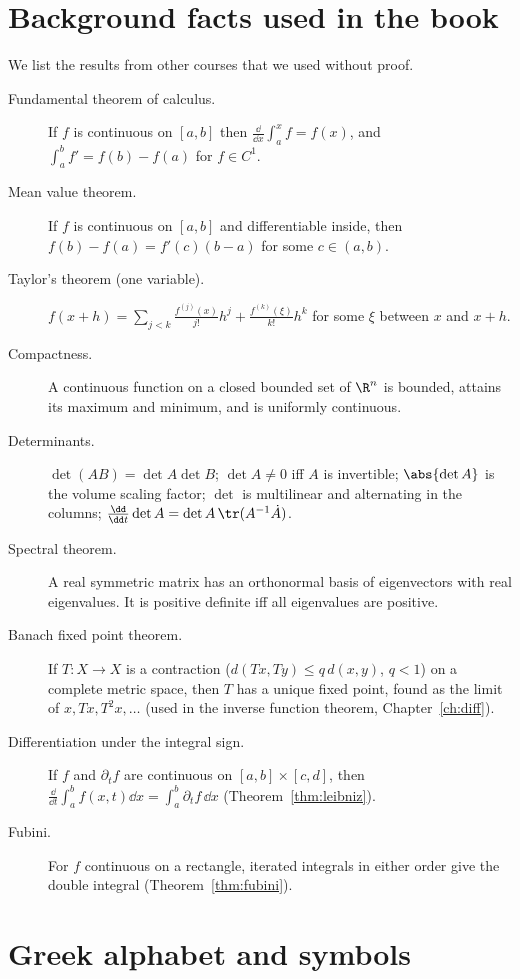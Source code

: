 \section{Background facts used in the book}

We list the results from other courses that we used without proof.

\begin{description}
  \item[Fundamental theorem of calculus.] If $f$ is continuous on $[a,b]$ then $\frac{\dd}{\dd x}\int_a^xf=f(x)$, and $\int_a^bf'=f(b)-f(a)$ for $f\in C^1$.
  \item[Mean value theorem.] If $f$ is continuous on $[a,b]$ and differentiable inside, then $f(b)-f(a)=f'(c)(b-a)$ for some $c\in(a,b)$.
  \item[Taylor's theorem (one variable).] $f(x+h)=\sum_{j<k}\frac{f^{(j)}(x)}{j!}h^j+\frac{f^{(k)}(\xi)}{k!}h^k$ for some $\xi$ between $x$ and $x+h$.
  \item[Compactness.] A continuous function on a closed bounded set of $\R^n$ is bounded, attains its maximum and minimum, and is uniformly continuous.
  \item[Determinants.] $\det(AB)=\det A\det B$; $\det A\neq0$ iff $A$ is invertible; $\abs{\det A}$ is the volume scaling factor; $\det$ is multilinear and alternating in the columns; $\frac{\dd}{\dd t}\det A=\det A\,\tr(A^{-1}\dot A)$.
  \item[Spectral theorem.] A real symmetric matrix has an orthonormal basis of eigenvectors with real eigenvalues. It is positive definite iff all eigenvalues are positive.
  \item[Banach fixed point theorem.] If $T:X\to X$ is a contraction ($d(Tx,Ty)\le q\,d(x,y)$, $q<1$) on a complete metric space, then $T$ has a unique fixed point, found as the limit of $x,Tx,T^2x,\dots$ (used in the inverse function theorem, Chapter~\ref{ch:diff}).
  \item[Differentiation under the integral sign.] If $f$ and $\partial_tf$ are continuous on $[a,b]\times[c,d]$, then $\frac{\dd}{\dd t}\int_a^bf(x,t)\dd x=\int_a^b\partial_tf\,\dd x$ (Theorem~\ref{thm:leibniz}).
  \item[Fubini.] For $f$ continuous on a rectangle, iterated integrals in either order give the double integral (Theorem~\ref{thm:fubini}).
\end{description}

\section{Greek alphabet and symbols}

